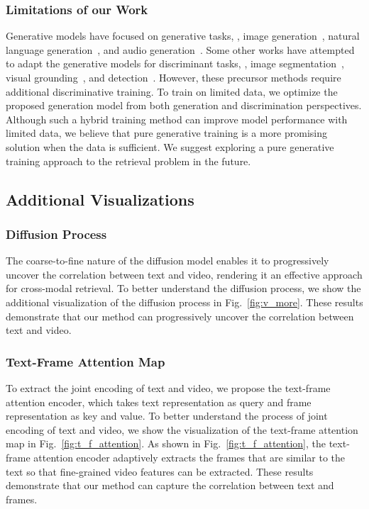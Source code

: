 \documentclass[10pt,twocolumn,letterpaper]{article}
\begin{document}
{\subsubsection{Limitations of our Work}\label{appendix:limitations}
Generative models have focused on generative tasks, \eg, image generation~\cite{ho2020denoising,song2020denoising}, natural language generation~\cite{austin2021structured,li2022diffusion}, and audio generation~\cite{popov2021grad}. Some other works have attempted to adapt the generative models for discriminant tasks, \eg, image segmentation~\cite{amit2021segdiff}, visual grounding~\cite{cheng2023parallel}, and detection~\cite{chen2022diffusiondet}. However, these precursor methods require additional discriminative training. To train on limited data, we optimize the proposed generation model from both generation and discrimination perspectives. Although such a hybrid training method can improve model performance with limited data, we believe that pure generative training is a more promising solution when the data is sufficient. We suggest exploring a pure generative training approach to the retrieval problem in the future.


\subsection{Additional Visualizations}
\subsubsection{Diffusion Process}\label{appendix:diffusion_process}
The coarse-to-fine nature of the diffusion model enables it to progressively uncover the correlation between text and video, rendering it an effective approach for cross-modal retrieval. To better understand the diffusion process, we show the additional visualization of the diffusion process in Fig.~\ref{fig:v_more}. These results demonstrate that our method can progressively uncover the correlation between text and video.

\subsubsection{Text-Frame Attention Map}\label{appendix:t_f_attention}
To extract the joint encoding of text and video, we propose the text-frame attention encoder, which takes text representation as query and frame representation as key and value. To better understand the process of joint encoding of text and video, we show the visualization of the text-frame attention map in Fig.~\ref{fig:t_f_attention}. As shown in Fig.~\ref{fig:t_f_attention}, the text-frame attention encoder adaptively extracts the frames that are similar to the text so that fine-grained video features can be extracted. These results demonstrate that our method can capture the correlation between text and frames.

}
\end{document}
